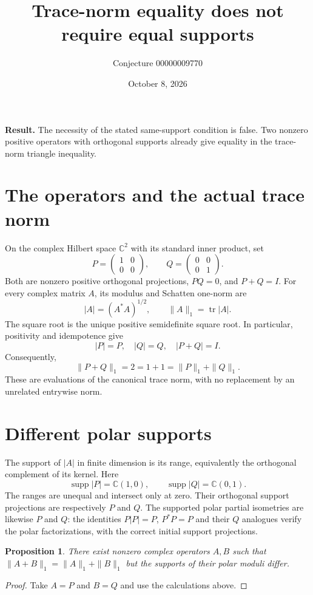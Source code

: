 \documentclass[11pt]{article}
\title{Trace-norm equality does not require equal supports}
\author{Conjecture 00000009770}
\date{October 8, 2026}
\newtheorem{proposition}{Proposition}
\begin{document}
\maketitle
\noindent\textbf{Result.} The necessity of the stated same-support condition is false. Two nonzero positive operators with orthogonal supports already give equality in the trace-norm triangle inequality.

\section*{The operators and the actual trace norm}
On the complex Hilbert space $\mathbb C^2$ with its standard inner product, set
\[
 P=\begin{pmatrix}1&0\\0&0\end{pmatrix},\qquad
 Q=\begin{pmatrix}0&0\\0&1\end{pmatrix}.
\]
Both are nonzero positive orthogonal projections, $PQ=0$, and $P+Q=I$.
For every complex matrix $A$, its modulus and Schatten one-norm are
\[
 |A|=(A^*A)^{1/2},\qquad \|A\|_1=\operatorname{tr}|A|.
\]
The square root is the unique positive semidefinite square root. In particular, positivity and idempotence give
\[
 |P|=P,\quad |Q|=Q,\quad |P+Q|=I.
\]
Consequently,
\[
 \|P+Q\|_1=2=1+1=\|P\|_1+\|Q\|_1.
\]
These are evaluations of the canonical trace norm, with no replacement by an unrelated entrywise norm.

\section*{Different polar supports}
The support of $|A|$ in finite dimension is its range, equivalently the orthogonal complement of its kernel. Here
\[
 \operatorname{supp}|P|=\mathbb C(1,0),\qquad
 \operatorname{supp}|Q|=\mathbb C(0,1).
\]
The ranges are unequal and intersect only at zero. Their orthogonal support projections are respectively $P$ and $Q$.
The supported polar partial isometries are likewise $P$ and $Q$: the identities
$P|P|=P$, $P^*P=P$ and their $Q$ analogues verify the polar factorizations, with the correct initial support projections.

\begin{proposition}
There exist nonzero complex operators $A,B$ such that
$\|A+B\|_1=\|A\|_1+\|B\|_1$ but the supports of their polar moduli differ.
\end{proposition}
\begin{proof}
Take $A=P$ and $B=Q$ and use the calculations above.
\end{proof}
\end{document}
